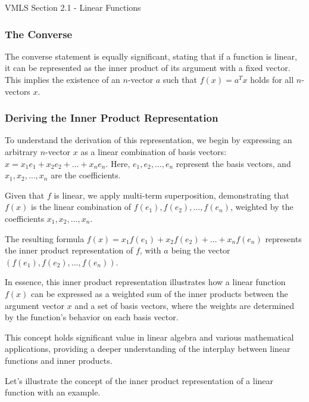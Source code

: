 \begin{notes}{VMLS Section 2.1 - Linear Functions}
    \subsubsection*{The Converse}
    
    The converse statement is equally significant, stating that if a function is linear, it can be represented as the inner product of its argument with a fixed vector. This implies the existence of an \(n\)-vector \(a\) such 
    that \(f(x) = a^T x\) holds for all \(n\)-vectors \(x\).
    
    \subsubsection*{Deriving the Inner Product Representation}
    
    To understand the derivation of this representation, we begin by expressing an arbitrary \(n\)-vector \(x\) as a linear combination of basis vectors: \(x = x_1e_1 + x_2e_2 + \ldots + x_ne_n\). Here, \(e_1, e_2, \ldots, e_n\) 
    represent the basis vectors, and \(x_1, x_2, \ldots, x_n\) are the coefficients.
    
    Given that \(f\) is linear, we apply multi-term superposition, demonstrating that \(f(x)\) is the linear combination of \(f(e_1), f(e_2), \ldots, f(e_n)\), weighted by the coefficients \(x_1, x_2, \ldots, x_n\).
    
    The resulting formula \(f(x) = x_1f(e_1) + x_2f(e_2) + \ldots + x_nf(e_n)\) represents the inner product representation of \(f\), with \(a\) being the vector \((f(e_1), f(e_2), \ldots, f(e_n))\).
    
    In essence, this inner product representation illustrates how a linear function \(f(x)\) can be expressed as a weighted sum of the inner products between the argument vector \(x\) and a set of basis vectors, where the weights 
    are determined by the function's behavior on each basis vector.
    
    This concept holds significant value in linear algebra and various mathematical applications, providing a deeper understanding of the interplay between linear functions and inner products.

    \begin{highlight}
        Let's illustrate the concept of the inner product representation of a linear function with an example.
        
        

\end{highlight}
\end{notes}
